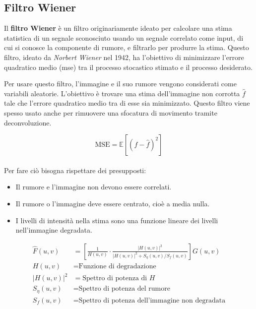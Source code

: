 \documentclass[../main.tex]{subfiles}
\begin{document}
\subsection{Filtro Wiener}

Il \textbf{filtro Wiener} è un filtro originariamente ideato per calcolare una stima statistica di un segnale sconosciuto usando un segnale correlato come input, di cui si conosce la componente di rumore, e filtrarlo per produrre la stima. Questo filtro, ideato da \textit{Norbert Wiener} nel 1942,\cite{wiener_1942} ha l'obiettivo di  minimizzare l'errore quadratico medio (\acrshort{mse}) tra il processo stocastico stimato e il processo desiderato.\cite{oppenheimer_2010}

Per usare questo filtro, l'immagine e il suo rumore vengono considerati come variabili aleatorie. L'obiettivo è trovare una stima dell'immagine non corrotta $\hat{f}$ tale che l'errore quadratico medio tra di esse sia minimizzato. Questo filtro viene spesso usato anche per rimuovere una sfocatura di movimento tramite deconvoluzione. 

\begin{equation}
	\text{MSE} = \mathbb{E}\left[\left(f-\hat{f}\right)^2\right]
\end{equation}
\\[-10pt]
Per fare ciò bisogna rispettare dei presupposti: \cite{bergamasco_2016}

\begin{itemize}
	\itemsep0em
	\item Il rumore e l'immagine non devono essere correlati.
	\item Il rumore o l'immagine deve essere centrato, cioè a media nulla.
	\item I livelli di intensità nella stima sono una funzione lineare dei livelli nell'immagine degradata.
\end{itemize}
\begin{align}
	\hat{F}(u,v) &= \left[\frac{1}{H(u,v)}\cdot\frac{\left|H(u,v)\right|^2}{\left|H(u,v)\right|^2+S_\eta(u,v)/S_f(u,v)}\right]G(u,v)\\[5pt]
	H(u,v) &= \text{Funzione di degradazione} \nonumber \\
	\left|H(u,v)\right|^2 &= \text{Spettro di potenza di } H \nonumber \\
	S_\eta(u,v) &= \text{Spettro di potenza del rumore} \nonumber \\
	S_f(u,v) &= \text{Spettro di potenza dell'immagine non degradata} \nonumber 
\end{align}
\end{document}
